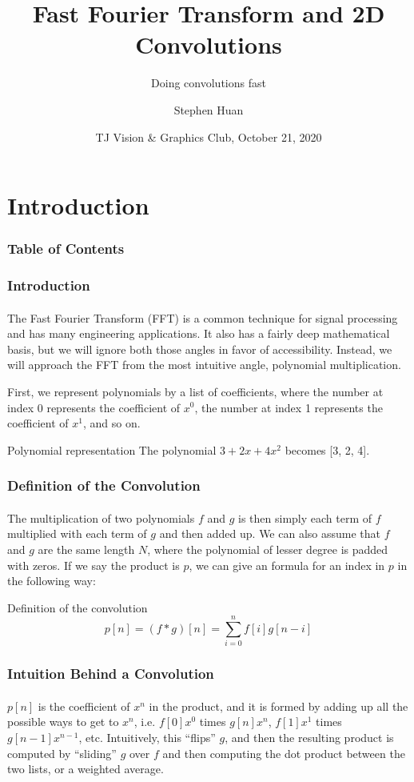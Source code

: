 \documentclass[11pt,handout]{beamer}             %
\title[FFT]{Fast Fourier Transform and 2D Convolutions}
\subtitle{Doing convolutions fast}
\author[Huan]{Stephen Huan\inst{1}}
\institute[TJHSST]
{
  \inst{1}
  Thomas Jefferson High School for Science and Technology
}
\date[]{TJ Vision \& Graphics Club, October 21, 2020}
\begin{document}
\frame{\titlepage}

\section{Introduction}
\begin{frame}
\frametitle{Table of Contents}
\tableofcontents[currentsection]
\end{frame}

\begin{frame}
\frametitle{Introduction}
\framesubtitle{}
The Fast Fourier Transform (FFT) is a common technique for signal processing
and has many engineering applications. It also has a fairly deep mathematical
basis, but we will ignore both those angles in favor of accessibility.
Instead, we will approach the FFT from the most intuitive angle,
\alert{polynomial multiplication}. \pause

First, we represent polynomials by a list of coefficients,
where the number at index 0 represents the coefficient of \( x^0 \),
the number at index 1 represents the coefficient of \( x^1 \), and so on.
\begin{exampleblock}{Polynomial representation}
  The polynomial \( 3 + 2x + 4x^2 \) becomes [3, 2, 4].
\end{exampleblock}
\end{frame}

\begin{frame}
\frametitle{Definition of the Convolution}
\framesubtitle{}
The multiplication of two polynomials \( f \) and \( g \) is then simply
each term of \( f \) multiplied with each term of \( g \) and then added up.
We can also assume that \( f \) and \( g \) are the same length \( N \),
where the polynomial of lesser degree is padded with zeros.
If we say the product is \( p \), we can give an formula
for an index in \( p \) in the following way:
\begin{alertblock}{Definition of the convolution}
  \[ p[n] = (f * g)[n] = \sum^n_{i = 0} f[i]g[n - i] \]
\end{alertblock}
\end{frame}

\begin{frame}
\frametitle{Intuition Behind a Convolution}
\framesubtitle{}
\( p[n] \) is the coefficient of \( x^n \) in the product, and it is formed
by adding up all the possible ways to get to \( x^n \), i.e. \( f[0] x^0 \)
times \( g[n] x^n \), \( f[1] x^1 \) times \( g[n - 1] x^{n - 1} \), etc.
Intuitively, this \enquote{flips} \( g \), and then the resulting product
is computed by \enquote{sliding} \( g \) over \( f \) and then computing
the dot product between the two lists, or a weighted average.
\end{frame}
\end{document}
